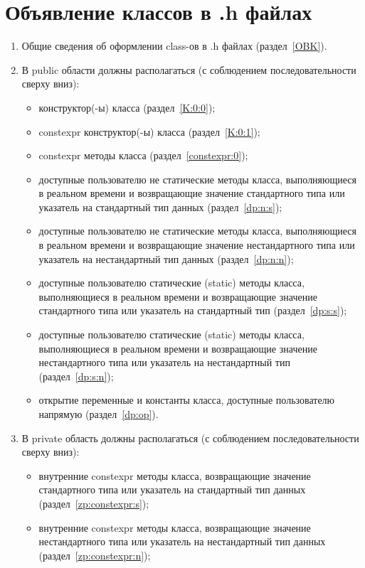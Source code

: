 \chapter{Объявление классов в .h файлах}\label{class:0}
\begin{enumerate}
	\item Общие сведения об оформлении class-ов в .h файлах (раздел~\ref{OBK}).
	\item В public области должны располагаться (с соблюдением последовательности сверху вниз):\begin{itemize}
		\item конструктор(-ы) класса (раздел~\ref{K:0:0});
		\item constexpr конструктор(-ы) класса (раздел~\ref{K:0:1});
		\item constexpr методы класса (раздел~\ref{constexpr:0});
		\item доступные пользователю не статические методы класса, выполняющиеся в реальном времени и возвращающие значение стандартного типа или указатель на стандартный тип данных (раздел~\ref{dp:n:s});
		\item доступные пользователю не статические методы класса, выполняющиеся в реальном времени и возвращающие значение нестандартного типа или указатель на нестандартный тип данных (раздел~\ref{dp:n:n});
		\item доступные пользователю статические (static) методы класса, выполняющиеся в реальном времени и возвращающие значение стандартного типа или указатель на стандартный тип (раздел~\ref{dp:s:s});
		\item доступные пользователю статические (static) методы класса, выполняющиеся в реальном времени и возвращающие значение нестандартного типа или указатель на нестандартный тип (раздел~\ref{dp:s:n});
		\item открытие переменные и константы класса, доступные пользователю напрямую (раздел~\ref{dp:op}).
	\end{itemize}
	\item В private область должны располагаться (с соблюдением последовательности сверху вниз):\begin{itemize}
		\item внутренние constexpr методы класса, возвращающие значение стандартного типа или указатель на стандартный тип данных (раздел~\ref{zp:constexpr:s});
		\item внутренние constexpr методы класса, возвращающие значение нестандартного типа или указатель на нестандартный тип данных (раздел~\ref{zp:constexpr:n});

\end{itemize}
\end{enumerate}
